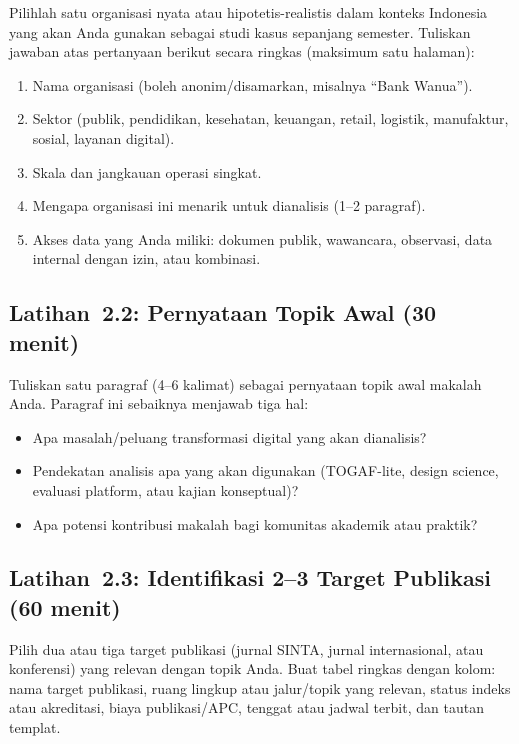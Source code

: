 Pilihlah satu organisasi nyata atau hipotetis-realistis dalam konteks
Indonesia yang akan Anda gunakan sebagai studi kasus sepanjang semester.
Tuliskan jawaban atas pertanyaan berikut secara ringkas (maksimum satu
halaman):

\begin{enumerate}
  \item Nama organisasi (boleh anonim/disamarkan, misalnya ``Bank Wanua'').
  \item Sektor (publik, pendidikan, kesehatan, keuangan, retail, logistik,
        manufaktur, sosial, layanan digital).
  \item Skala dan jangkauan operasi singkat.
  \item Mengapa organisasi ini menarik untuk dianalisis (1--2 paragraf).
  \item Akses data yang Anda miliki: dokumen publik, wawancara, observasi,
        data internal dengan izin, atau kombinasi.
\end{enumerate}

\subsection*{Latihan~2.2: Pernyataan Topik Awal (30 menit)}

Tuliskan satu paragraf (4--6 kalimat) sebagai pernyataan topik awal makalah
Anda. Paragraf ini sebaiknya menjawab tiga hal:

\begin{itemize}
  \item Apa masalah/peluang transformasi digital yang akan dianalisis?
  \item Pendekatan analisis apa yang akan digunakan (TOGAF-lite, design
        science, evaluasi platform, atau kajian konseptual)?
  \item Apa potensi kontribusi makalah bagi komunitas akademik atau praktik?
\end{itemize}

\subsection*{Latihan~2.3: Identifikasi 2--3 Target Publikasi (60 menit)}

Pilih dua atau tiga target publikasi (jurnal SINTA, jurnal internasional, atau
konferensi) yang relevan dengan topik Anda. Buat tabel ringkas dengan kolom:
nama target publikasi, ruang lingkup atau jalur/topik yang relevan, status
indeks atau akreditasi, biaya publikasi/APC, tenggat atau jadwal terbit, dan
tautan templat.

